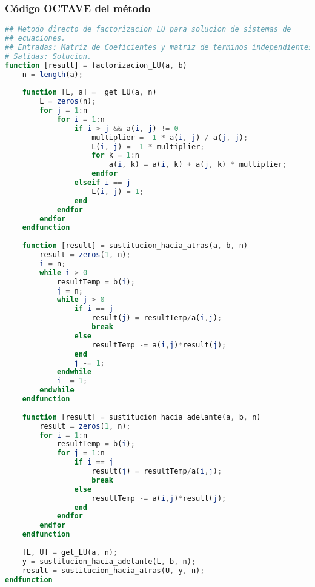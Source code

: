 \documentclass[12pt]{article}
\begin{document}
\subsubsection{Código OCTAVE del método}
\begin{lstlisting}[language=OCTAVE, caption=Implementación del método de Factorizacion LU en Octave]
## Metodo directo de factorizacion LU para solucion de sistemas de 
## ecuaciones.
## Entradas: Matriz de Coeficientes y matriz de terminos independientes.
# Salidas: Solucion.
function [result] = factorizacion_LU(a, b)
    n = length(a);
    
    function [L, a] =  get_LU(a, n)
        L = zeros(n);
        for j = 1:n
            for i = 1:n
                if i > j && a(i, j) != 0
                    multiplier = -1 * a(i, j) / a(j, j);
                    L(i, j) = -1 * multiplier;
                    for k = 1:n
                        a(i, k) = a(i, k) + a(j, k) * multiplier;
                    endfor
                elseif i == j
                    L(i, j) = 1;
                end
            endfor
        endfor
    endfunction 
    
    function [result] = sustitucion_hacia_atras(a, b, n)
        result = zeros(1, n);
        i = n;
        while i > 0
            resultTemp = b(i);
            j = n;
            while j > 0
                if i == j
                    result(j) = resultTemp/a(i,j);
                    break
                else
                    resultTemp -= a(i,j)*result(j);
                end
                j -= 1;
            endwhile    
            i -= 1;
        endwhile
    endfunction
    
    function [result] = sustitucion_hacia_adelante(a, b, n)
        result = zeros(1, n);
        for i = 1:n
            resultTemp = b(i);
            for j = 1:n
                if i == j
                    result(j) = resultTemp/a(i,j);
                    break
                else
                    resultTemp -= a(i,j)*result(j);
                end
            endfor
        endfor    
    endfunction
    
    [L, U] = get_LU(a, n);
    y = sustitucion_hacia_adelante(L, b, n);
    result = sustitucion_hacia_atras(U, y, n);
endfunction

\end{lstlisting}
\end{document}
